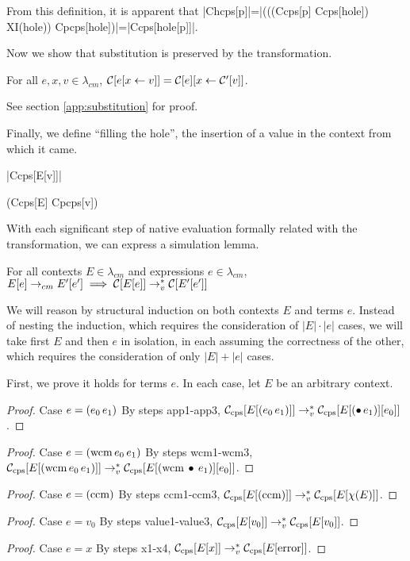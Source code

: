From this definition, it is apparent that \scheme|Chcps[p]|=\scheme|(((Ccps[p] Ccps[hole]) XI(hole)) Cpcps[hole])|=\scheme|Ccps[hole[p]]|.

Now we show that substitution is preserved by the transformation.

\begin{lemma}[Substitution]
\label{lem:substitution}
For all $e,x,v\in\lambda_{cm}$, $\mathcal{C}[e[x\leftarrow v]]=\mathcal{C}[e][x\leftarrow \mathcal{C}'[v]]$.
\end{lemma}

See section \ref{app:substitution} for proof.

Finally, we define ``filling the hole'', the insertion of a value in the context from which it came.

\begin{schemedefinition}{\scheme|Ccps[E[v]]|}
\begin{schemeblock}
\begin{schemedisplay}
(Ccps[E] Cpcps[v])
\end{schemedisplay}
\end{schemeblock}
\end{schemedefinition}

With each significant step of native evaluation formally related with the transformation, we can express a simulation lemma.

\begin{lemma}[Simulation]
For all contexts $E\in\lambda_{cm}$ and expressions $e\in\lambda_{cm}$, $E[e]\rightarrow_{cm} E'[e']\implies\mathcal{C}[E[e]]\rightarrow_v^{*}\mathcal{C}[E'[e']]$
\end{lemma}

We will reason by structural induction on both contexts $E$ and terms $e$. Instead of
nesting the induction, which requires the consideration of $|E|\cdot|e|$ cases, we will
take first $E$ and then $e$ in isolation, in each assuming the correctness of the other,
which requires the consideration of only $|E|+|e|$ cases.

First, we prove it holds for terms $e$. In each case, let $E$ be an arbitrary context.
\begin{proof}{Case $e=(e_0\,e_1)$}
By steps app1-app3, $\mathcal{C}_{\mathrm{cps}}[E[(e_0\,e_1)]]\rightarrow_v^{*}\mathcal{C}_{\mathrm{cps}}[E[(\bullet\,e_1)][e_0]]$.
\end{proof}
\begin{proof}{Case $e=(\mathrm{wcm}\,e_0\,e_1)$}
By steps wcm1-wcm3, $\mathcal{C}_{\mathrm{cps}}[E[(\mathrm{wcm}\,e_0\,e_1)]]\rightarrow_v^{*}\mathcal{C}_{\mathrm{cps}}[E[(\mathrm{wcm}\,\bullet\,e_1)][e_0]]$.
\end{proof}
\begin{proof}{Case $e=(\mathrm{ccm})$}
By steps ccm1-ccm3, $\mathcal{C}_{\mathrm{cps}}[E[(\mathrm{ccm})]]\rightarrow_v^{*}\mathcal{C}_{\mathrm{cps}}[E[\chi(E)]]$.
\end{proof}
\begin{proof}{Case $e=v_0$}
By steps value1-value3, $\mathcal{C}_{\mathrm{cps}}[E[v_0]]\rightarrow_v^{*}\mathcal{C}_{\mathrm{cps}}[E[v_0]]$.
\end{proof}
\begin{proof}{Case $e=x$}
By steps x1-x4, $\mathcal{C}_{\mathrm{cps}}[E[x]]\rightarrow_v^{*}\mathcal{C}_{\mathrm{cps}}[E[\mathrm{error}]]$.
\end{proof}

